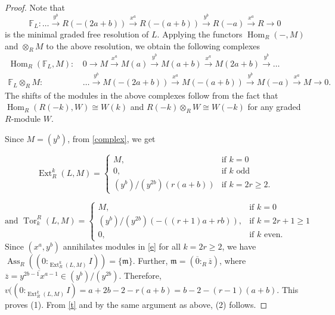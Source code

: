 \documentclass[11pt,reqno]{amsart}
\theoremstyle{definition}
\newcommand{\m}{\mathfrak{m}}
\newcommand{\Ass}{\operatorname{Ass}}
\newcommand{\Hom}{\operatorname{Hom}}
\newcommand{\Ext}{\operatorname{Ext}}
\newcommand{\Tor}{\operatorname{Tor}}
\begin{document}
\begin{proof}
    Note that $$\mathbb F_L: \ldots \xrightarrow{y^b}R(-(2a+b))\xrightarrow{x^a}R(-(a+b))\xrightarrow{y^b}R(-a)\xrightarrow{x^a}R\to 0$$ is the minimal graded free resolution of $L.$ Applying the functors $\Hom_R(-,M)$ and $\otimes_RM$ to the above resolution, we obtain the following complexes
    \begin{equation}\label{complex}
        \begin{split}
            \Hom_R(\mathbb F_L,M) : &\, 0\to M\xrightarrow{x^a}M(a)\xrightarrow{y^b}M(a+b)\xrightarrow{x^a}M(2a+b)\xrightarrow{y^b} \ldots \\ \mathbb F_L\otimes_R M : &\, \ldots \xrightarrow{y^b} M(-(2a+b))\xrightarrow{x^a} M(-(a+b)) \xrightarrow{y^b}M(-a)\xrightarrow{x^a}M\to 0.
        \end{split}
    \end{equation}
The shifts of the modules in the above complexes follow from the fact that $\Hom_R(R(-k),W)\cong W(k)$ and $R(-k)\otimes_R W\cong W(-k)$ for any graded $R$-module $W.$

Since $M=(y^b)$, from \eqref{complex}, we get 

\begin{equation}\label{e}
    \Ext^k_R(L,M)=\begin{cases}
            M, & \text{if } k=0 \\ 0, & \text{if } k \text{ odd}\\ (y^b)/(y^{2b})(r(a+b))  & \text{if } k=2r\geq 2.
         \end{cases}
\end{equation}

\begin{equation}\label{t}
 \text{and }    \Tor_k^R(L,M)=\begin{cases}
              M, & \text{if } k=0 \\ (y^b)/(y^{2b})(-((r+1)a+rb)), & \text{if } k=2r+1\geq 1 \\ 0,  & \text{if } k \text{ even}.
         \end{cases}
\end{equation}
Since $(x^a,y^b)$ annihilates modules in \eqref{e} for all $k=2r\geq 2$, we have  $\Ass_R((0:_{\Ext^k_R(L,M)}I))=\{\m\}$. Further, $\m=(\overline{0}:_R\overline{z})$, where $\overline{z}=\overline{y^{2b-1}x^{a-1}}\in (y^b)/(y^{2b}).$ Therefore, $v((0:_{\Ext^k_R(L,M)}I)=a+2b-2-r(a+b)=b-2-(r-1)(a+b).$ This proves (1). From \eqref{t} and by the same argument as above, (2) follows.


\end{proof}
\end{document}
